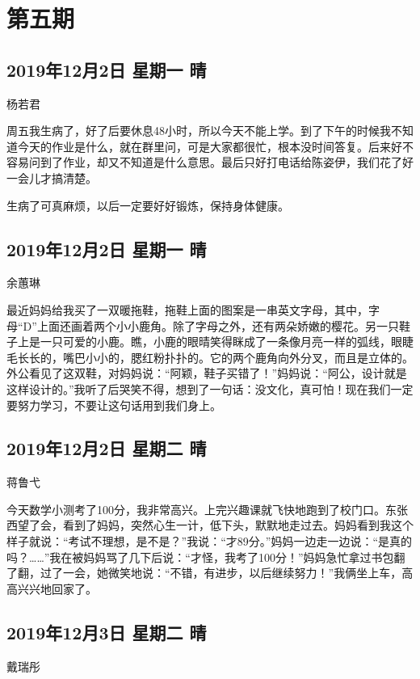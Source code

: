 \chapter{第五期}

\section{2019年12月2日 星期一 晴}

杨若君

周五我生病了，好了后要休息48小时，所以今天不能上学。到了下午的时候我不知道今天的作业是什么，就在群里问，可是大家都很忙，根本没时间答复。后来好不容易问到了作业，却又不知道是什么意思。最后只好打电话给陈姿伊，我们花了好一会儿才搞清楚。

生病了可真麻烦，以后一定要好好锻炼，保持身体健康。

\section{2019年12月2日 星期一 晴}

余蕙琳

最近妈妈给我买了一双暖拖鞋，拖鞋上面的图案是一串英文字母，其中，字母“D”上面还画着两个小小鹿角。除了字母之外，还有两朵娇嫩的樱花。另一只鞋子上是一只可爱的小鹿。瞧，小鹿的眼晴笑得眯成了一条像月亮一样的弧线，眼睫毛长长的，嘴巴小小的，腮红粉扑扑的。它的两个鹿角向外分叉，而且是立体的。外公看见了这双鞋，对妈妈说：“阿颖，鞋子买错了！”妈妈说：“阿公，设计就是这样设计的。”我听了后哭笑不得，想到了一句话：没文化，真可怕！现在我们一定要努力学习，不要让这句话用到我们身上。

\section{2019年12月2日 星期二 晴}

蒋鲁弋

今天数学小测考了100分，我非常高兴。上完兴趣课就飞快地跑到了校门口。东张西望了会，看到了妈妈，突然心生一计，低下头，默默地走过去。妈妈看到我这个样子就说：“考试不理想，是不是？”我说：“才89分。”妈妈一边走一边说：“是真的吗？……”我在被妈妈骂了几下后说：“才怪，我考了100分！”妈妈急忙拿过书包翻了翻，过了一会，她微笑地说：“不错，有进步，以后继续努力！”我俩坐上车，高高兴兴地回家了。

\section{2019年12月3日 星期二 晴}

戴瑞彤

